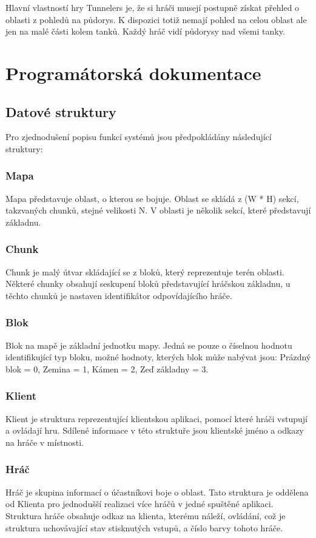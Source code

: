 \documentclass[12pt,a4paper]{article}
\let\oldsection\section
\renewcommand\section{\clearpage\oldsection}
\begin{document}
Hlavní vlastností hry Tunnelers je, že si hráči musejí postupně získat přehled o oblasti z pohledů na půdorys. K dispozici totiž nemají pohled na celou oblast ale jen na malé části kolem tanků. Každý hráč vidí půdorysy nad všemi tanky.


\section{Programátorská dokumentace}
\subsection{Datové struktury}
Pro zjednodušení popisu funkcí systémů jsou předpokládány následující struktury:
\subsubsection*{Mapa}
Mapa představuje oblast, o kterou se bojuje. Oblast se skládá z (W * H) sekcí, takzvaných chunků, stejné velikosti N. V oblasti je několik sekcí, které představují základnu.
\subsubsection*{Chunk}
Chunk je malý útvar skládající se z bloků, který reprezentuje terén oblasti. Některé chunky obsahují seskupení bloků představující hráčskou základnu, u těchto chunků je nastaven identifikátor odpovídajícího hráče.
\subsubsection*{Blok}
Blok na mapě je základní jednotku mapy. Jedná se pouze o číselnou hodnotu identifikující typ bloku, možné hodnoty, kterých blok může nabývat jsou: Prázdný blok = 0, Zemina = 1, Kámen = 2, Zeď základny = 3.
\subsubsection*{Klient}
Klient je struktura reprezentující klientskou aplikaci, pomocí které hráči vstupují a ovládají hru. Sdílené informace v této struktuře jsou klientské jméno a odkazy na hráče v místnosti.
\subsubsection*{Hráč}
Hráč je skupina informací o účastníkovi boje o oblast. Tato struktura je oddělena od Klienta pro jednodušší realizaci více hráčů v jedné spuštěné aplikaci. Struktura hráče obsahuje odkaz na klienta, kterému náleží, ovládání, což je struktura uchovávající stav stisknutých vstupů, a číslo barvy tohoto hráče.
\end{document}
